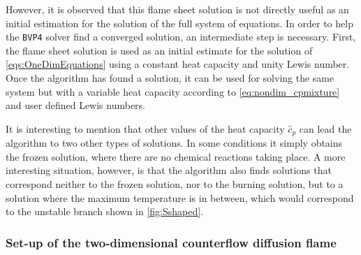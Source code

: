 However, it is observed that this flame sheet solution is not directly useful as an initial estimation for the solution of the full system of equations. In order to help  the \lstinline|BVP4| solver find a converged solution, an intermediate step is necessary. First, the flame sheet solution is used as an initial estimate for the solution of  \cref{eqs:OneDimEquations} using a constant heat capacity and unity Lewis number. Once the algorithm has found a solution, it can be used for solving the same system but with a variable heat capacity according to \cref{eq:nondim_cpmixture} and user defined Lewis numbers.

It is interesting to mention that other values of the heat capacity $\hat c_p$ can lead the algorithm to two other types of solutions. In some conditions it simply obtains the frozen solution, where there are no chemical reactions taking place. A more interesting situation, however, is that the algorithm also finds solutions that correspond neither to the frozen solution, nor to the burning solution, but to a solution where the maximum temperature is in between, which would correspond to the unstable branch shown in \cref{fig:Sshaped}.
\subsubsection{Set-up of the two-dimensional counterflow diffusion flame}

